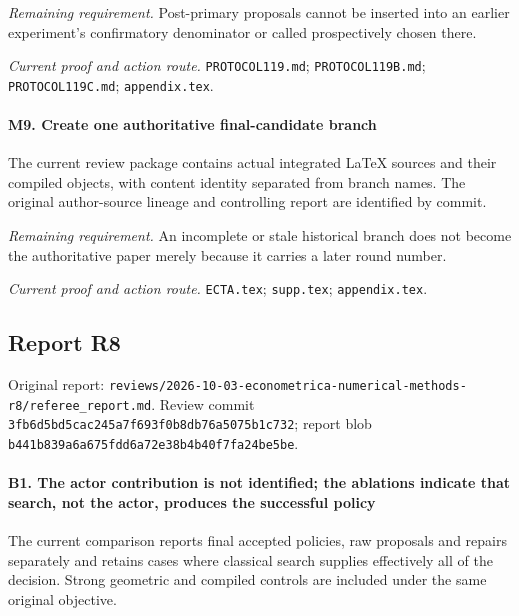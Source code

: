 \par\emph{Remaining requirement.} Post-primary proposals cannot be inserted into an earlier experiment's confirmatory denominator or called prospectively chosen there.

\par\emph{Current proof and action route.} \nolinkurl{PROTOCOL119.md}; \nolinkurl{PROTOCOL119B.md}; \nolinkurl{PROTOCOL119C.md}; \nolinkurl{appendix.tex}.

\paragraph{M9. Create one authoritative final-candidate branch}

The current review package contains actual integrated LaTeX sources and their compiled objects, with content identity separated from branch names. The original author-source lineage and controlling report are identified by commit.

\par\emph{Remaining requirement.} An incomplete or stale historical branch does not become the authoritative paper merely because it carries a later round number.

\par\emph{Current proof and action route.} \nolinkurl{ECTA.tex}; \nolinkurl{supp.tex}; \nolinkurl{appendix.tex}.

\subsection{Report R8}

Original report: \nolinkurl{reviews/2026-10-03-econometrica-numerical-methods-r8/referee_report.md}. Review commit \nolinkurl{3fb6d5bd5cac245a7f693f0b8db76a5075b1c732}; report blob \nolinkurl{b441b839a6a675fdd6a72e38b4b40f7fa24be5be}.

\paragraph{B1. The actor contribution is not identified; the ablations indicate that search, not the actor, produces the successful policy}

The current comparison reports final accepted policies, raw proposals and repairs separately and retains cases where classical search supplies effectively all of the decision. Strong geometric and compiled controls are included under the same original objective.

